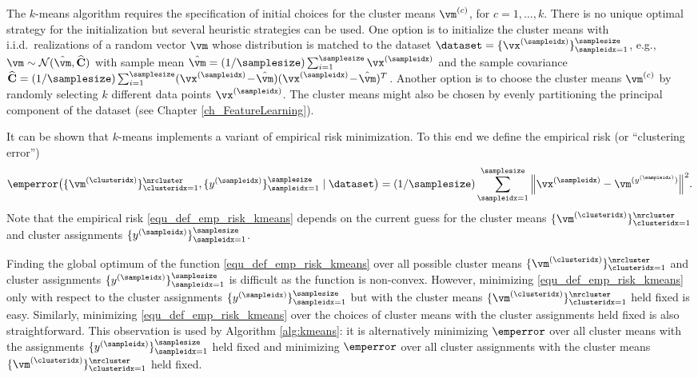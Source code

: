 \documentclass[12pt]{report}
\begin{document}
The $k$-means algorithm requires the specification of initial choices for the cluster means $\vm^{(c)}$, for $c=1,\ldots,k$. 
There is no unique optimal strategy for the initialization but several heuristic strategies can be used. 
One option is to initialize the cluster means with i.i.d.\ realizations of a random vector $\vm$ whose 
distribution is matched to the dataset $\dataset = \{ \vx^{(\sampleidx)} \}_{\sampleidx=1}^{\samplesize}$, e.g., $\vm \sim \mathcal{N}( \hat{\vm}, \widehat{\mathbf{C}})$ 
with sample mean $\hat{\vm} = (1/\samplesize) \sum_{i=1}^{\samplesize} \vx^{(\sampleidx)}$ and the sample covariance 
$\widehat{\mathbf{C}} = (1/\samplesize) \sum_{i=1}^{\samplesize} (\vx^{(\sampleidx)}\!-\!\hat{\vm}) (\vx^{(\sampleidx)}\!-\!\hat{\vm})^{T}$. 
Another option is to choose the cluster means $\vm^{(c)}$ by randomly selecting $k$ different data points $\vx^{(\sampleidx)}$. 
The cluster means might also be chosen by evenly partitioning the principal component of the dataset 
(see Chapter \ref{ch_FeatureLearning}). 

It can be shown that $k$-means implements a variant of empirical risk minimization. 
To this end we define the empirical risk (or ``clustering error'')
\begin{equation}
\label{equ_def_emp_risk_kmeans}
\vspace*{-2mm}
 \emperror \big( \{\vm^{(\clusteridx)}\}_{\clusteridx=1}^{\nrcluster},\{y^{(\sampleidx)}\}_{\sampleidx=1}^{\samplesize} \mid \dataset \big)
=(1/\samplesize) \sum_{\sampleidx=1}^{\samplesize} {\left\|\vx^{(\sampleidx)}-\vm^{(y^{(\sampleidx)})}\right\|^2}.
\end{equation} 
Note that the empirical risk \eqref{equ_def_emp_risk_kmeans} depends on the current guess for the cluster means 
$\{ \vm^{(\clusteridx)} \}_{\clusteridx=1}^{\nrcluster}$ and cluster assignments $\{ y^{(\sampleidx)} \}_{\sampleidx=1}^{\samplesize}$. 

Finding the global optimum of the function \eqref{equ_def_emp_risk_kmeans} over all possible cluster 
means $\{\vm^{(\clusteridx)}\}_{\clusteridx=1}^{\nrcluster}$ and cluster assignments $\{y^{(\sampleidx)}\}_{\sampleidx=1}^{\samplesize}$ is difficult as the function is non-convex. 
However, minimizing \eqref{equ_def_emp_risk_kmeans} only with respect to the cluster assignments $\{y^{(\sampleidx)}\}_{\sampleidx=1}^{\samplesize}$ 
but with the cluster means $\{\vm^{(\clusteridx)}\}_{\clusteridx=1}^{\nrcluster}$ held fixed is easy. 
Similarly, minimizing \eqref{equ_def_emp_risk_kmeans} over the choices of cluster means with 
the cluster assignments held fixed is also straightforward. This observation is used by Algorithm 
\ref{alg:kmeans}:  it is alternatively minimizing $\emperror$ over all cluster means with the assignments 
$\{ y^{(\sampleidx)} \}_{\sampleidx=1}^{\samplesize}$ held fixed and minimizing $\emperror$ over all 
cluster assignments with the cluster means $\{ \vm^{(\clusteridx)} \}_{\clusteridx=1}^{\nrcluster}$ held fixed. 
\end{document}
